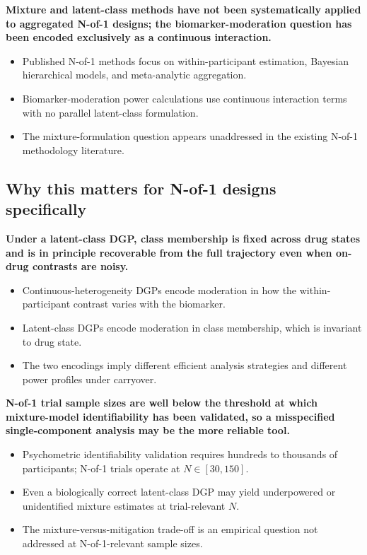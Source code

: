 \documentclass[
  11pt,
]{article}
\begin{document}
\textbf{Mixture and latent-class methods have not been systematically
applied to aggregated N-of-1 designs; the biomarker-moderation
question has been encoded exclusively as a continuous interaction.}

\begin{itemize}\setlength{\itemsep}{2pt}\setlength{\parskip}{0pt}
\item Published N-of-1 methods focus on within-participant estimation,
  Bayesian hierarchical models, and meta-analytic aggregation.
\item Biomarker-moderation power calculations use continuous
  interaction terms with no parallel latent-class formulation.
\item The mixture-formulation question appears unaddressed in the
  existing N-of-1 methodology literature.
\end{itemize}

\subsection{Why this matters for N-of-1 designs specifically}\label{why-this-matters-for-n-of-1-designs-specifically}

\textbf{Under a latent-class DGP, class membership is fixed across
drug states and is in principle recoverable from the full trajectory
even when on-drug contrasts are noisy.}

\begin{itemize}\setlength{\itemsep}{2pt}\setlength{\parskip}{0pt}
\item Continuous-heterogeneity DGPs encode moderation in how the
  within-participant contrast varies with the biomarker.
\item Latent-class DGPs encode moderation in class membership, which
  is invariant to drug state.
\item The two encodings imply different efficient analysis strategies
  and different power profiles under carryover.
\end{itemize}

\textbf{N-of-1 trial sample sizes are well below the threshold at which
mixture-model identifiability has been validated, so a misspecified
single-component analysis may be the more reliable tool.}

\begin{itemize}\setlength{\itemsep}{2pt}\setlength{\parskip}{0pt}
\item Psychometric identifiability validation requires hundreds to
  thousands of participants; N-of-1 trials operate at $N \in [30,150]$.
\item Even a biologically correct latent-class DGP may yield
  underpowered or unidentified mixture estimates at trial-relevant $N$.
\item The mixture-versus-mitigation trade-off is an empirical question
  not addressed at N-of-1-relevant sample sizes.
\end{itemize}
\end{document}
